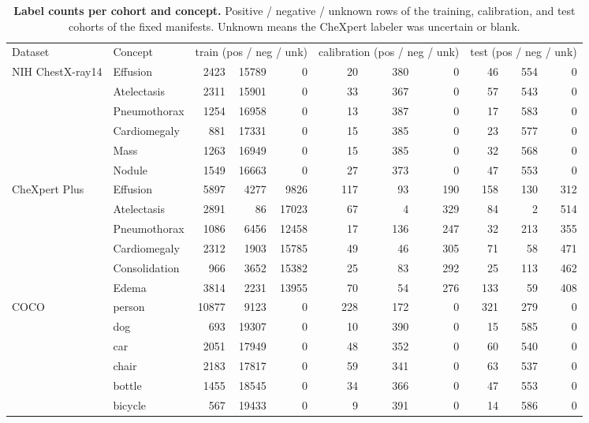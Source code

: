 \begin{table}[h]
\centering
\scriptsize
\setlength{\tabcolsep}{4pt}
\caption{\textbf{Label counts per cohort and concept.} Positive / negative / unknown rows of the training, calibration, and test cohorts of the fixed manifests. Unknown means the CheXpert labeler was uncertain or blank.}
\label{tab:cf-prevalence}
\begin{tabular}{llrrrrrrrrr}
\toprule
Dataset & Concept & \multicolumn{3}{c}{train (pos / neg / unk)} & \multicolumn{3}{c}{calibration (pos / neg / unk)} & \multicolumn{3}{c}{test (pos / neg / unk)} \\
\cmidrule(lr){3-5}\cmidrule(lr){6-8}\cmidrule(lr){9-11}
NIH ChestX-ray14 & Effusion & 2423 & 15789 & 0 & 20 & 380 & 0 & 46 & 554 & 0 \\
 & Atelectasis & 2311 & 15901 & 0 & 33 & 367 & 0 & 57 & 543 & 0 \\
 & Pneumothorax & 1254 & 16958 & 0 & 13 & 387 & 0 & 17 & 583 & 0 \\
 & Cardiomegaly & 881 & 17331 & 0 & 15 & 385 & 0 & 23 & 577 & 0 \\
 & Mass & 1263 & 16949 & 0 & 15 & 385 & 0 & 32 & 568 & 0 \\
 & Nodule & 1549 & 16663 & 0 & 27 & 373 & 0 & 47 & 553 & 0 \\
\addlinespace
CheXpert Plus & Effusion & 5897 & 4277 & 9826 & 117 & 93 & 190 & 158 & 130 & 312 \\
 & Atelectasis & 2891 & 86 & 17023 & 67 & 4 & 329 & 84 & 2 & 514 \\
 & Pneumothorax & 1086 & 6456 & 12458 & 17 & 136 & 247 & 32 & 213 & 355 \\
 & Cardiomegaly & 2312 & 1903 & 15785 & 49 & 46 & 305 & 71 & 58 & 471 \\
 & Consolidation & 966 & 3652 & 15382 & 25 & 83 & 292 & 25 & 113 & 462 \\
 & Edema & 3814 & 2231 & 13955 & 70 & 54 & 276 & 133 & 59 & 408 \\
\addlinespace
COCO & person & 10877 & 9123 & 0 & 228 & 172 & 0 & 321 & 279 & 0 \\
 & dog & 693 & 19307 & 0 & 10 & 390 & 0 & 15 & 585 & 0 \\
 & car & 2051 & 17949 & 0 & 48 & 352 & 0 & 60 & 540 & 0 \\
 & chair & 2183 & 17817 & 0 & 59 & 341 & 0 & 63 & 537 & 0 \\
 & bottle & 1455 & 18545 & 0 & 34 & 366 & 0 & 47 & 553 & 0 \\
 & bicycle & 567 & 19433 & 0 & 9 & 391 & 0 & 14 & 586 & 0 \\
\bottomrule
\end{tabular}
\end{table}
